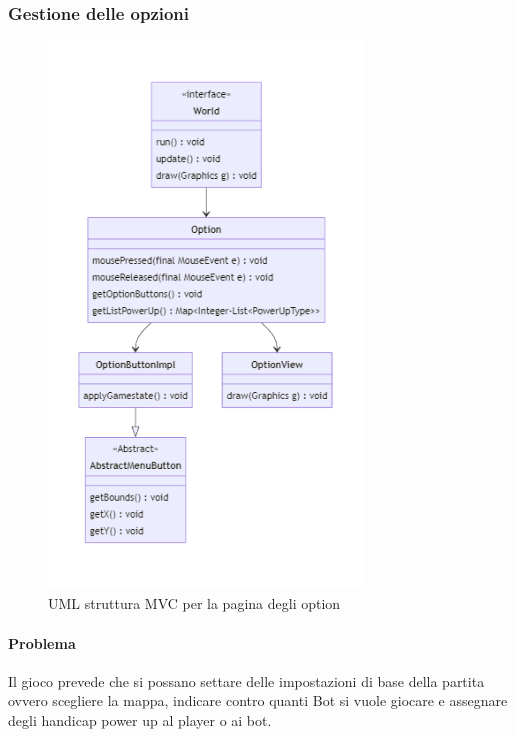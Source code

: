 \documentclass[a4paper,12pt]{report}
\begin{document}
\subsubsection{Gestione delle opzioni}

\begin{figure}[H]
    \centering{}
    \includegraphics[width=0.75\textwidth]{img/UMLGestioneOpzioni.png}
    \caption{UML struttura MVC per la pagina degli option}
\end{figure}

\paragraph{Problema} Il gioco prevede che si possano settare delle impostazioni di base della partita ovvero scegliere la mappa, indicare contro quanti Bot si vuole giocare e assegnare degli handicap power up al player o ai bot.
\end{document}
